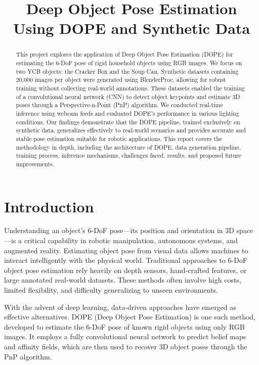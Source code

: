 \documentclass[conference]{IEEEtran}
\title{Deep Object Pose Estimation Using DOPE and Synthetic Data}
\author{
\IEEEauthorblockN{Yash Wakde}
\IEEEauthorblockA{\textit{Northeastern University} \\
Boston, MA \\
wakde.y@northeastern.edu}
\and
\IEEEauthorblockN{Deepak Ramesh}
\IEEEauthorblockA{\textit{Northeastern University} \\
Boston, MA \\
ramesh.deep@northeastern.edu}
}
\begin{document}
\maketitle

\begin{abstract}
This project explores the application of Deep Object Pose Estimation (DOPE) for estimating the 6-DoF pose of rigid household objects using RGB images. We focus on two YCB objects: the Cracker Box and the Soup Can. Synthetic datasets containing 20,000 images per object were generated using BlenderProc, allowing for robust training without collecting real-world annotations. These datasets enabled the training of a convolutional neural network (CNN) to detect object keypoints and estimate 3D poses through a Perspective-n-Point (PnP) algorithm. We conducted real-time inference using webcam feeds and evaluated DOPE's performance in various lighting conditions. Our findings demonstrate that the DOPE pipeline, trained exclusively on synthetic data, generalizes effectively to real-world scenarios and provides accurate and stable pose estimation suitable for robotic applications. This report covers the methodology in depth, including the architecture of DOPE, data generation pipeline, training process, inference mechanisms, challenges faced, results, and proposed future improvements.
\end{abstract}

\section{Introduction}
Understanding an object's 6-DoF pose—its position and orientation in 3D space—is a critical capability in robotic manipulation, autonomous systems, and augmented reality. Estimating object pose from visual data allows machines to interact intelligently with the physical world. Traditional approaches to 6-DoF object pose estimation rely heavily on depth sensors, hand-crafted features, or large annotated real-world datasets. These methods often involve high costs, limited flexibility, and difficulty generalizing to unseen environments.

With the advent of deep learning, data-driven approaches have emerged as effective alternatives. DOPE (Deep Object Pose Estimation) is one such method, developed to estimate the 6-DoF pose of known rigid objects using only RGB images. It employs a fully convolutional neural network to predict belief maps and affinity fields, which are then used to recover 3D object poses through the PnP algorithm.
\end{document}
